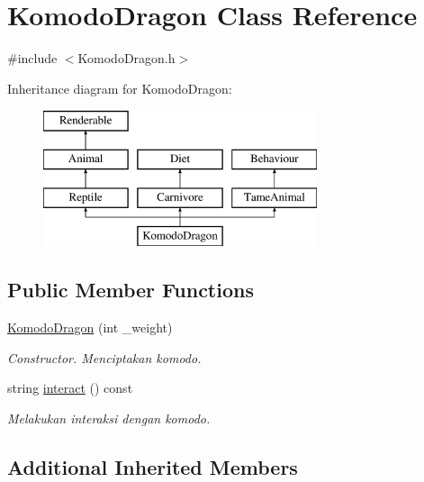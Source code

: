\hypertarget{classKomodoDragon}{\section{Komodo\+Dragon Class Reference}
\label{classKomodoDragon}
}


{\ttfamily \#include $<$Komodo\+Dragon.\+h$>$}

Inheritance diagram for Komodo\+Dragon\+:\begin{figure}[H]
\begin{center}
\leavevmode
\includegraphics[height=4.000000cm]{classKomodoDragon}
\end{center}
\end{figure}
\subsection*{Public Member Functions}
\begin{DoxyCompactItemize}
\item 
\hypertarget{classKomodoDragon_a4426d1f077191ccf5e1ace6aebf17489}{\hyperlink{classKomodoDragon_a4426d1f077191ccf5e1ace6aebf17489}{Komodo\+Dragon} (int \+\_\+weight)}\label{classKomodoDragon_a4426d1f077191ccf5e1ace6aebf17489}

\begin{DoxyCompactList}\small\item\em Constructor. Menciptakan komodo. \end{DoxyCompactList}\item 
string \hyperlink{classKomodoDragon_ae6a9ac6072e527cba59bd9f36bd592a7}{interact} () const 
\begin{DoxyCompactList}\small\item\em Melakukan interaksi dengan komodo. \end{DoxyCompactList}\end{DoxyCompactItemize}
\subsection*{Additional Inherited Members}


